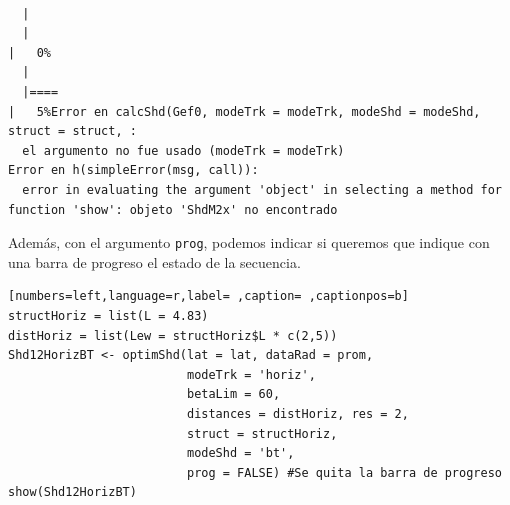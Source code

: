 \begin{verbatim}

  |                                                                                                   
  |                                                                                             |   0%
  |                                                                                                   
  |====                                                                                         |   5%Error en calcShd(Gef0, modeTrk = modeTrk, modeShd = modeShd, struct = struct, : 
  el argumento no fue usado (modeTrk = modeTrk)
Error en h(simpleError(msg, call)): 
  error in evaluating the argument 'object' in selecting a method for function 'show': objeto 'ShdM2x' no encontrado
\end{verbatim}


Además, con el argumento \texttt{prog}, podemos indicar si queremos que indique con una barra de progreso el estado de la secuencia.

\begin{lstlisting}[numbers=left,language=r,label= ,caption= ,captionpos=b]
structHoriz = list(L = 4.83)
distHoriz = list(Lew = structHoriz$L * c(2,5))
Shd12HorizBT <- optimShd(lat = lat, dataRad = prom,
                         modeTrk = 'horiz',
                         betaLim = 60,
                         distances = distHoriz, res = 2,
                         struct = structHoriz,
                         modeShd = 'bt',
                         prog = FALSE) #Se quita la barra de progreso
show(Shd12HorizBT)
\end{lstlisting}

